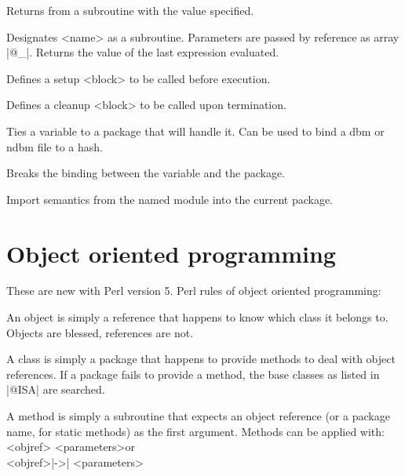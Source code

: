 \begin{enum}{1cm}
Returns from a subroutine with the value specified.

Designates <name> as a subroutine. Parameters are passed by reference
as array |@_|. Returns the value of the last expression evaluated. 

Defines a setup <block> to be called before execution.\ddag

Defines a cleanup <block> to be called upon termination.\ddag

Ties a variable to a package that will handle it.
Can be used to bind a dbm or ndbm file to a hash.\ddag 

Breaks the binding between the variable and the package.\ddag

Import semantics from the named module into the current package.

\end{enum}


\section{Object oriented programming \ddag} 

\ddag These are new with Perl version 5.  Perl rules of object oriented programming:

\begin{enum}{3mm}

\Xj{$\bullet$}
An object is simply a reference that happens to know which class it
belongs to.
\newline Objects are blessed, references are not.

\Xj{$\bullet$}
A class is simply a package that happens to provide methods to deal
with object references.
\newline If a package fails to provide a method, the base classes as
listed in |@ISA| are searched.

\Xj{$\bullet$}
A method is simply a subroutine that expects an object reference (or a
package name, for static methods) as the first argument.
\newline Methods can be applied with:\\
\hspace*{1cm} <objref> <parameters>\quad\quad\quad\quad or\\
\hspace*{1cm}<objref>|->| <parameters>

\end{enum}


